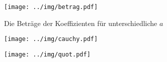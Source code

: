 \begin{comment}
Um den Satz \ref{thm:convKrit} anzuwenden, betrachten wir
\begin{align*}
\sqrt[n]{|v_{n}|} &= \sqrt[n]{\left| - \frac{i}{2\sqrt{2a}}
  \left((n+1)v_{n-1} + \sum_{k=1}^{n-1} v_{k-1}v_{n-k-1}\right) \right|}
\\&= \sqrt[n]{\left| u_{-2} \right|}^{-1}
 \sqrt[n]{\left|(n+1)v_{n-1} + \sum_{k=1}^{n-1} v_{k-1}v_{n-k-1} \right|} 
\end{align*}
\end{comment}
\begin{comment}
In einer geeigneten Programmiersprache ist es nun einfach die $v_n$ und
$u_n$ Numerisch zu berechnen. So wird ein geeigneter Quellcode in Anhang
\ref{anh:Programm} vorgestellt. Mit diesen Programm wurde für verschiedene $a$
numerisch die Beträge der Koeffizienten berechnet und in abhängigkeit von $n$
in Abbildung \ref{fig:plotKoeffs} dargestellt.
\end{comment}
\begin{figure}[htbp]
  \centering
  \texttt{[image: ../img/betrag.pdf]}
  \caption[Koeffizienten in abhängigkeit von $a$]
   {Die Beträge der Koeffizienten für unterschiedliche $a$}
  \label{fig:plotKoeffs}
\end{figure}
\begin{figure}[htbp]
  \centering
  \texttt{[image: ../img/cauchy.pdf]}
  \label{fig:plotCauchyKoeffs}
\end{figure}
\begin{figure}[htbp]
  \centering
  \texttt{[image: ../img/quot.pdf]}
  \label{fig:plotCauchyKoeffs}
\end{figure}

